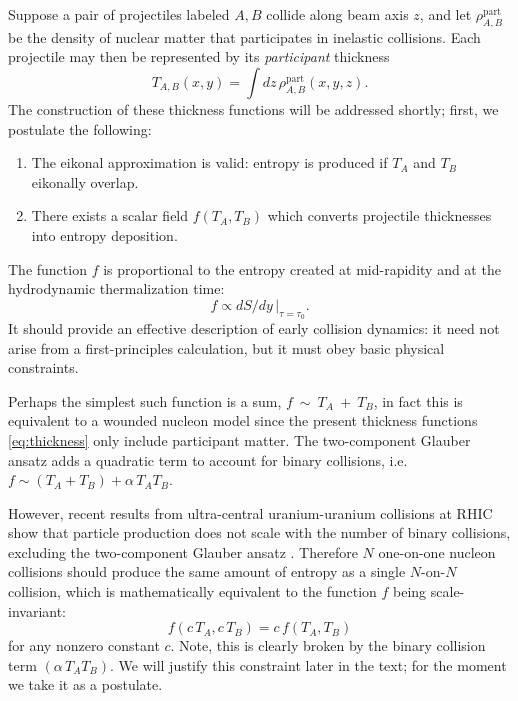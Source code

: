\documentclass[aps,prc,reprint,amsmath,noeprint]{revtex4-1}
\begin{document}
Suppose a pair of projectiles labeled $A, B$ collide along beam axis $z$, and let $\rho^\text{part}_{A,B}$ be the density of nuclear matter that participates in inelastic collisions.
Each projectile may then be represented by its \emph{participant} thickness
\begin{equation}
  T_{A,B}(x, y) = \int dz \, \rho^\text{part}_{A,B}(x, y, z).
  \label{eq:thickness}
\end{equation}
The construction of these thickness functions will be addressed shortly; first, we postulate the following:
\begin{enumerate}
  \item The eikonal approximation is valid:  entropy is produced if $T_A$ and $T_B$ eikonally overlap.
  \item There exists a scalar field $f(T_A, T_B)$ which converts projectile thicknesses into entropy
    deposition.
\end{enumerate}
The function $f$ is proportional to the entropy created at mid-rapidity and at the hydrodynamic thermalization
time:
\begin{equation}
  f \propto dS/dy \, |_{\tau = \tau_0}.
\end{equation}
It should provide an effective description of early collision dynamics:
it need not arise from a first-principles calculation, but it must obey basic physical constraints.

Perhaps the simplest such function is a sum, $f~\sim~T_A~+~T_B$, in fact this is equivalent to a wounded nucleon model since the present thickness functions \eqref{eq:thickness} only include participant matter.
The two-component Glauber ansatz adds a quadratic term to account for binary collisions, i.e.\ $f \sim (T_A + T_B) + \alpha \, T_A T_B$.

However, recent results from ultra-central uranium-uranium collisions at RHIC \cite{FortheSTAR:2013bza,Wang:2014qxa} show that particle production does not scale with the number of binary collisions, excluding the two-component Glauber ansatz \cite{Goldschmidt:2015qya}.
Therefore $N$ \mbox{one-on-one} nucleon collisions should produce the same amount of entropy as a single \mbox{$N$-on-$N$} collision, which is mathematically equivalent to the function $f$ being scale-invariant:
\begin{equation}
  f(c \, T_A, c \, T_B) = c \, f(T_A, T_B)
  \label{eq:scale-inv}
\end{equation}
for any nonzero constant $c$.
Note, this is clearly broken by the binary collision term $(\alpha \, T_A T_B)$.
We will justify this constraint later in the text; for the moment we take it as a postulate.
\end{document}
